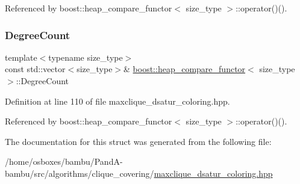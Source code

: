 Referenced by boost\+::heap\+\_\+compare\+\_\+functor$<$ size\+\_\+type $>$\+::operator()().

\mbox{\label{structboost_1_1heap__compare__functor_aab2d0fa30b3527f610b4edc3652baeef}} 
\subsubsection{\texorpdfstring{Degree\+Count}{DegreeCount}}
{\footnotesize\ttfamily template$<$typename size\+\_\+type$>$ \\
const std\+::vector$<$size\+\_\+type$>$\& \hyperlink{structboost_1_1heap__compare__functor}{boost\+::heap\+\_\+compare\+\_\+functor}$<$ size\+\_\+type $>$\+::Degree\+Count\hspace{0.3cm}{\ttfamily [private]}}



Definition at line 110 of file maxclique\+\_\+dsatur\+\_\+coloring.\+hpp.



Referenced by boost\+::heap\+\_\+compare\+\_\+functor$<$ size\+\_\+type $>$\+::operator()().



The documentation for this struct was generated from the following file\+:\begin{DoxyCompactItemize}
\item 
/home/osboxes/bambu/\+Pand\+A-\/bambu/src/algorithms/clique\+\_\+covering/\hyperlink{maxclique__dsatur__coloring_8hpp}{maxclique\+\_\+dsatur\+\_\+coloring.\+hpp}\end{DoxyCompactItemize}
